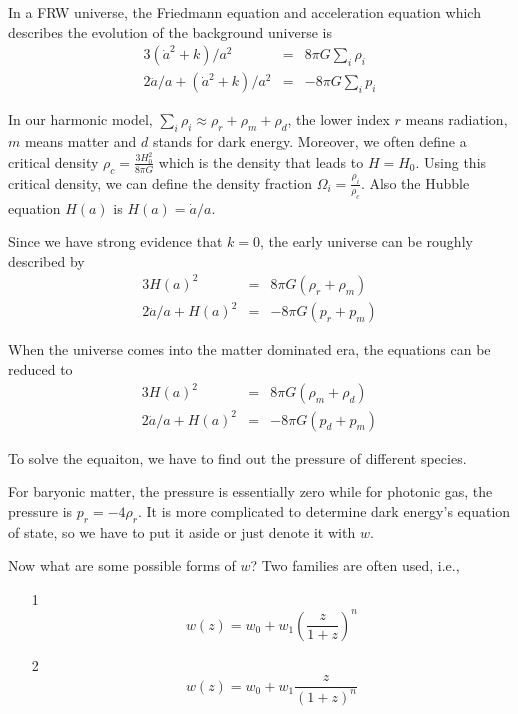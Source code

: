 \documentclass[12pt,a4paper]{book}
\begin{document}
In a FRW universe, the Friedmann equation and acceleration equation which describes the evolution of the background universe is
\begin{eqnarray}
	3(\dot a^2 + k)/ a^2 &=& 8\pi G \sum_i \rho_i \\
	2\ddot a/a + (\dot a^2 + k)/a^2 &=&-8\pi G \sum_i p_i
\end{eqnarray}

In our harmonic model, $\sum_i \rho_i \approx \rho_r + \rho_m + \rho_d$, the lower index $r$ means radiation, $m$ means matter and $d$ stands for dark energy. Moreover, we often define a critical density $\rho_c = \frac{3H_0^2}{8\pi G}$ which is the density that leads to $H=H_0$. Using this critical density, we can define the density fraction $\Omega_i = \frac{\rho_i}{\rho_c}$. Also the Hubble equation $H(a)$ is $H(a) = \dot a/a$.

Since we have strong evidence that $k=0$, the early universe can be roughly described by
\begin{eqnarray}
	3 H(a)^2 &=& 8\pi G (\rho_r + \rho_m) \\
	2 \ddot a/a + H(a)^2 &=& -8\pi G (p_r + p_m)
\end{eqnarray}

When the universe comes into the matter dominated era, the equations can be reduced to
\begin{eqnarray}
	3 H(a)^2 &=& 8\pi G (\rho_m + \rho_d) \\
	2\ddot a/a + H(a)^2 &=& -8\pi G (p_d + p_m)
\end{eqnarray}

To solve the equaiton, we have to find out the pressure of different species.

For baryonic matter, the pressure is essentially zero while for photonic gas, the pressure is $p_r = -4 \rho_r$.
It is more complicated to determine dark energy's equation of state, so we have to put it aside or just denote it with $w$.

Now what are some possible forms of $w$? Two families are often used, i.e.,
\begin{itemize}
	\item [1]
\begin{equation}
w(z) = w_0 + w_1 (\frac{z}{1+z})^n
\end{equation}
	\item [2]
\begin{equation}
w(z) = w_0 + w_1 \frac{z}{(1+z)^n}
\end{equation}
\end{itemize}
\end{document}
